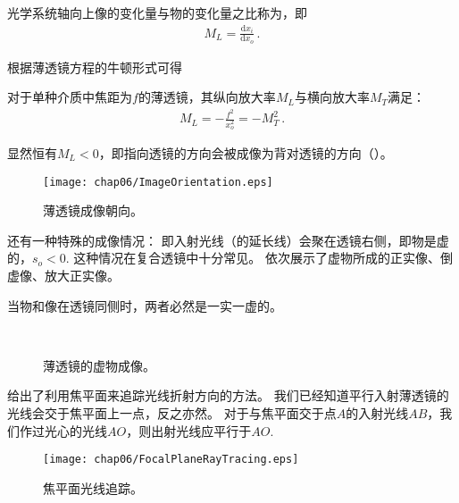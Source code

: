\begin{definition}
    光学系统轴向上像的变化量与物的变化量之比称为，即
    \begin{align}
        M_L=\frac{\mathrm{d}x_i}{\mathrm{d}x_o}\, .
    \end{align}
\end{definition}
根据薄透镜方程的牛顿形式可得
\begin{corollary}
    对于单种介质中焦距为$f$的薄透镜，其纵向放大率$M_L$与横向放大率$M_T$满足：
    \begin{align}
        M_L=-\frac{f^2}{x_o^2}=-M_T^2\, .
    \end{align}
\end{corollary}
显然恒有$M_L<0$，即指向透镜的方向会被成像为背对透镜的方向（）。
\begin{figure}[htbp]
    \centering\texttt{[image: chap06/ImageOrientation.eps]}
    \caption{薄透镜成像朝向。}
    \label{fig:6.41}
\end{figure}

还有一种特殊的成像情况：
即入射光线（的延长线）会聚在透镜右侧，即物是虚的，$s_o<0$.
这种情况在复合透镜中十分常见。
依次展示了虚物所成的正实像、倒虚像、放大正实像。
\begin{corollary}
    当物和像在透镜同侧时，两者必然是一实一虚的。
\end{corollary}
\begin{figure}[htbp]
    \centering
    \,
    \\
    \caption{薄透镜的虚物成像。}
    \label{fig:6.42}
\end{figure}

给出了利用焦平面来追踪光线折射方向的方法。
我们已经知道平行入射薄透镜的光线会交于焦平面上一点，反之亦然。
对于与焦平面交于点$A$的入射光线$AB$，我们作过光心的光线$AO$，则出射光线应平行于$AO$.
\begin{figure}[htbp]
    \centering\texttt{[image: chap06/FocalPlaneRayTracing.eps]}
    \caption{焦平面光线追踪。}
    \label{fig:6.43}
\end{figure}

